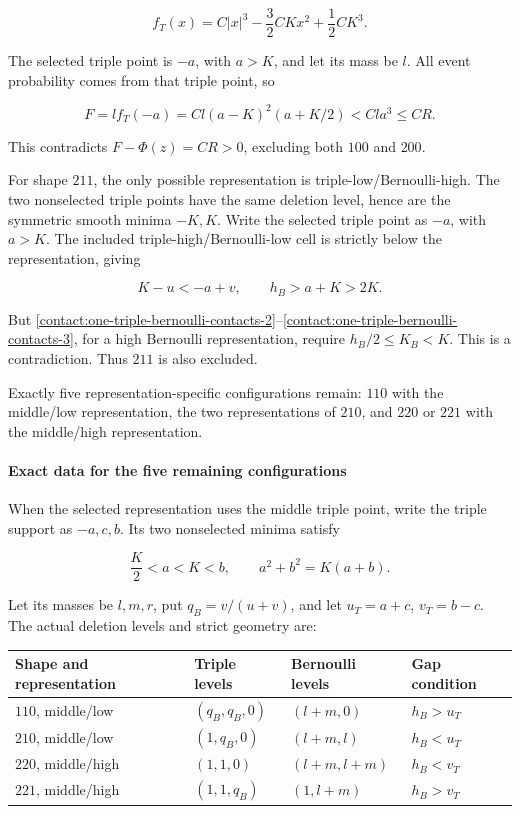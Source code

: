 \[
 f_T(x)=C|x|^3-\frac32 CKx^2+\frac12 CK^3.
\]

The selected triple point is $-a$, with $a>K$, and let its mass be $l$.
All event probability comes from that triple point, so

\[
 F=l f_T(-a)=Cl(a-K)^2(a+K/2)<Cl a^3\leq CR.
\]

This contradicts $F-\Phi(z)=CR>0$, excluding both $100$ and $200$.

For shape $211$, the only possible representation is triple-low/Bernoulli-high.
The two nonselected triple points have the same deletion level, hence
are the symmetric smooth minima $-K,K$. Write the selected triple point
as $-a$, with $a>K$. The included triple-high/Bernoulli-low cell is
strictly below the representation, giving

\[
 K-u<-a+v,\qquad h_B>a+K>2K.
\]

But \eqref{contact:one-triple-bernoulli-contacts-2}--\eqref{contact:one-triple-bernoulli-contacts-3}, for a high Bernoulli representation, require
$h_B/2\le K_B<K$. This is a contradiction. Thus $211$ is also excluded.

Exactly five representation-specific configurations remain: $110$ with the
middle/low representation, the two representations of $210$, and $220$ or $221$ with
the middle/high representation.

\paragraph{Exact data for the five remaining configurations}

When the selected representation uses the middle triple point, write the triple support as $-a,c,b$.
Its two nonselected minima satisfy

\[
 \frac{K}{2}<a<K<b,\qquad a^2+b^2=K(a+b).
\tag{B.5.4}\label{contact:one-triple-bernoulli-contacts-4}
\]

Let its masses be $l,m,r$, put $q_B=v/(u+v)$, and let
$u_T=a+c$, $v_T=b-c$. The actual deletion levels and strict geometry are:

\begin{center}\small
\begin{tabular}{llll}\toprule
Shape and representation & Triple levels & Bernoulli levels & Gap condition\\\midrule
$110$, middle/low & $(q_B,q_B,0)$ & $(l+m,0)$ & $h_B>u_T$\\
$210$, middle/low & $(1,q_B,0)$ & $(l+m,l)$ & $h_B<u_T$\\
$220$, middle/high & $(1,1,0)$ & $(l+m,l+m)$ & $h_B<v_T$\\
$221$, middle/high & $(1,1,q_B)$ & $(1,l+m)$ & $h_B>v_T$\\
\bottomrule\end{tabular}\end{center}


